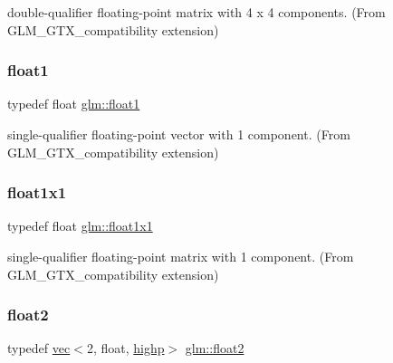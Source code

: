double-\/qualifier floating-\/point matrix with 4 x 4 components. (From G\+L\+M\+\_\+\+G\+T\+X\+\_\+compatibility extension) 

\mbox{\label{group__gtx__compatibility_gae0ad1b0450320cda98bbbecb56bc3167}} 
\subsubsection{\texorpdfstring{float1}{float1}}
{\footnotesize\ttfamily typedef float \hyperlink{group__gtx__compatibility_gae0ad1b0450320cda98bbbecb56bc3167}{glm\+::float1}}



single-\/qualifier floating-\/point vector with 1 component. (From G\+L\+M\+\_\+\+G\+T\+X\+\_\+compatibility extension) 

\mbox{\label{group__gtx__compatibility_gaac1faa940ac1fbb32d4a315005b578af}} 
\subsubsection{\texorpdfstring{float1x1}{float1x1}}
{\footnotesize\ttfamily typedef float \hyperlink{group__gtx__compatibility_gaac1faa940ac1fbb32d4a315005b578af}{glm\+::float1x1}}



single-\/qualifier floating-\/point matrix with 1 component. (From G\+L\+M\+\_\+\+G\+T\+X\+\_\+compatibility extension) 

\mbox{\label{group__gtx__compatibility_gaba973334bf704aa382f9b0dc06b59cf8}} 
\subsubsection{\texorpdfstring{float2}{float2}}
{\footnotesize\ttfamily typedef \hyperlink{structglm_1_1vec}{vec}$<$2, float, \hyperlink{namespaceglm_a36ed105b07c7746804d7fdc7cc90ff25ac6f7eab42eacbb10d59a58e95e362074}{highp}$>$ \hyperlink{group__gtx__compatibility_gaba973334bf704aa382f9b0dc06b59cf8}{glm\+::float2}}




